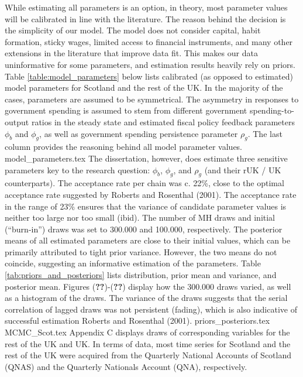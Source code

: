While estimating all parameters is an option, in theory, most parameter values will be calibrated in line with the literature. The reason behind the decision is the simplicity of our model. The model does not consider capital, habit formation, sticky wages, limited access to financial instruments, and many other extensions in the literature that improve data fit. This makes our data uninformative for some parameters, and estimation results heavily rely on priors. Table \ref{table:model_parameters} below lists calibrated (as opposed to estimated) model parameters for Scotland and the rest of the UK. In the majority of the cases, parameters are assumed to be symmetrical. The asymmetry in responses to government spending is assumed to stem from different government spending-to-output ratios in the steady state and estimated fiscal policy feedback parameters $\phi_b$ and $\phi_g$, as well as government spending persistence parameter $\rho_g$. The last column provides the reasoning behind all model parameter values.
{model_parameters.tex}
The dissertation, however, does estimate three sensitive parameters key to the research question: $\phi_b$, $\phi_g$, and $\rho_g$ (and their rUK / UK counterparts). The acceptance rate per chain was c. 22\%, close to the optimal acceptance rate suggested by Roberts and Rosenthal (2001). The acceptance rate in the range of 23\% ensures that the variance of candidate parameter values is neither too large nor too small (ibid). The number of MH draws and initial (``burn-in'') draws was set to 300.000 and 100.000, respectively. The posterior means of all estimated parameters are close to their initial values, which can be primarily attributed to tight prior variance. However, the two means do not coincide, suggesting an informative estimation of the parameters. Table \ref{tab:priors_and_posteriors} lists distribution, prior mean and variance, and posterior mean. Figures (\textbf{??})-(\textbf{??}) display how the 300.000 draws varied, as well as a histogram of the draws. The variance of the draws suggests that the serial correlation of lagged draws was not persistent (fading), which is also indicative of successful estimation Roberts and Rosenthal (2001).
{priors_posteriors.tex}
{MCMC_Scot.tex}
Appendix C displays draws of corresponding variables for the rest of the UK and UK. In terms of data, most time series for Scotland and the rest of the UK were acquired from the Quarterly National Accounts of Scotland (QNAS) and the Quarterly Nationals Account (QNA), respectively.

